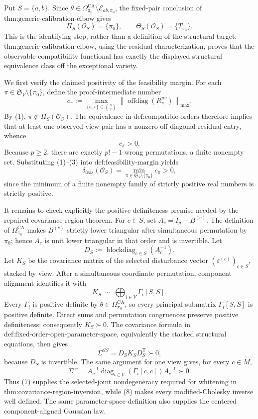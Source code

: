 Put \(S=\{a,b\}\).  Since \(\theta\in\Omega_{\pi_0}^{\mathrm{CA}}\setminus\mathcal E_{ab,\pi_0}\), the fixed-pair conclusion of \(\text{thm:generic-calibration-elbow}\) gives
\[
\Pi_S(\mathcal O_S)=\{\pi_0\},
\qquad
\Theta_S(\mathcal O_S)=\{T_{\pi_0}\}.
\tag{1}
\]
This is the identifying step, rather than a definition of the structural target: \(\text{thm:generic-calibration-elbow}\), using the residual characterization, proves that the observable compatibility functional has exactly the displayed structural equivalence class off the exceptional variety.

We first verify the claimed positivity of the feasibility margin.  For each \(\pi\in\mathfrak S_V\setminus\{\pi_0\}\), define the proof-intermediate number
\[
c_\pi
:=
\max_{\{u,v\}\in\binom S2}
\left\|\operatorname{offdiag}(R_\pi^{uv})\right\|_{\max}.
\tag{2}
\]
By (1), \(\pi\notin\Pi_S(\mathcal O_S)\).  The equivalence in \(\text{def:compatible-orders}\) therefore implies that at least one observed view pair has a nonzero off-diagonal residual entry, whence
\[
c_\pi>0.
\tag{3}
\]
Because \(p\ge2\), there are exactly \(p!-1\) wrong permutations, a finite nonempty set.  Substituting (1)--(3) into \(\text{def:feasibility-margin}\) yields
\[
\delta_{\mathrm{feas}}(\mathcal O_S)
=
\min_{\pi\in\mathfrak S_V\setminus\{\pi_0\}}c_\pi
>0,
\tag{4}
\]
since the minimum of a finite nonempty family of strictly positive real numbers is strictly positive.

It remains to check explicitly the positive-definiteness premise needed by the repaired covariance-region theorem.  For \(c\in S\), set \(A_c=I_p-B^{(c)}\).  The definition of \(\Omega_{\pi_0}^{\mathrm{CA}}\) makes \(B^{(c)}\) strictly lower triangular after simultaneous permutation by \(\pi_0\); hence \(A_c\) is unit lower triangular in that order and is invertible.  Let
\[
D_S:=\operatorname{blockdiag}_{c\in S}(A_c^{-1}).
\tag{5}
\]
Let \(K_S\) be the covariance matrix of the selected disturbance vector \((\varepsilon^{(c)})_{c\in S}\), stacked by view.  After a simultaneous coordinate permutation, component alignment identifies it with
\[
K_S\ \sim\ \bigoplus_{i\in V}\Gamma_i[S,S].
\tag{6}
\]
Every \(\Gamma_i\) is positive definite by \(\theta\in\Omega_{\pi_0}^{\mathrm{CA}}\), so every principal submatrix \(\Gamma_i[S,S]\) is positive definite.  Direct sums and permutation congruences preserve positive definiteness; consequently \(K_S\succ0\).  The covariance formula in \(\text{def:fixed-order-open-parameter-space}\), equivalently the stacked structural equations, then gives
\[
\Sigma^{SS}=D_SK_SD_S^{\mathsf T}\succ0,
\tag{7}
\]
because \(D_S\) is invertible.  The same argument for one view gives, for every \(c\in M\),
\[
\Sigma^{cc}
=A_c^{-1}\operatorname{diag}_{i\in V}(\Gamma_i[c,c])A_c^{-\mathsf T}
\succ0.
\tag{8}
\]
Thus (7) supplies the selected-joint nondegeneracy required for whitening in \(\text{thm:covariance-region-inversion}\), while (8) makes every modified-Cholesky inverse well defined.  The same parameter-space definition also supplies the centered component-aligned Gaussian law.

